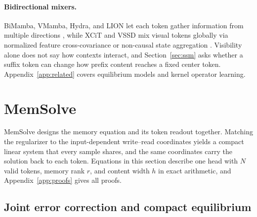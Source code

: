 \documentclass[10pt,twocolumn]{article}
\begin{document}
\paragraph{Bidirectional mixers.}
BiMamba, VMamba, Hydra, and LION let each token gather information from
multiple directions \cite{zhu2024vim,liu2024vmamba,hwang2024hydra,afzal2025lion},
while XCiT and VSSD mix visual tokens globally via normalized feature
cross-covariance or non-causal state aggregation \cite{ali2021xcit,shi2025vssd}.
Visibility alone does not say how contexts interact, and
Section~\ref{sec:ssm} asks whether a suffix token can change how prefix content
reaches a fixed center token.
Appendix~\ref{app:related} covers equilibrium models
\cite{bai2019deep,winston2020mondeq} and kernel operator learning.

\section{MemSolve}
\label{sec:method}
\label{sec:theory}

MemSolve designs the memory equation and its token readout together.
Matching the regularizer to the input-dependent write--read coordinates yields
a compact linear system that every sample shares, and the same coordinates
carry the solution back to each token.
Equations in this section describe one head with $N$ valid tokens, memory rank
$r$, and content width $h$ in exact arithmetic, and
Appendix~\ref{app:proofs} gives all proofs.

\subsection{Joint error correction and compact equilibrium}
\label{sec:joint-memory}
\label{sec:equilibrium}
\end{document}
